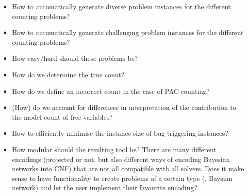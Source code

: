 \documentclass[a4paper]{tufte-handout}
\begin{document}
	\begin{questions}
		\begin{itemize}
			\item How to automatically generate diverse problem instances for the different counting problems?
			\item How to automatically generate challenging problem instances for the different counting problems?
			\item How easy/hard should these problems be?
			\item How do we determine the true count?
			\item How do we define an incorrect count in the case of PAC counting?
			\item (How) do we account for differences in interpretation of the contribution to the model count of free variables?
			\item How to efficiently minimise the instance size of bug triggering instances?
			\item How modular should the resulting tool be? There are many different encodings (projected or not, but also different ways of encoding Bayesian networks into CNF) that are not all compatible with all solvers. Does it make sense to have functionality to create problems of a certain type (\eg{}, Baysian network) and let the user implement their favourite encoding?
		\end{itemize}
	\end{questions}
\end{document}
